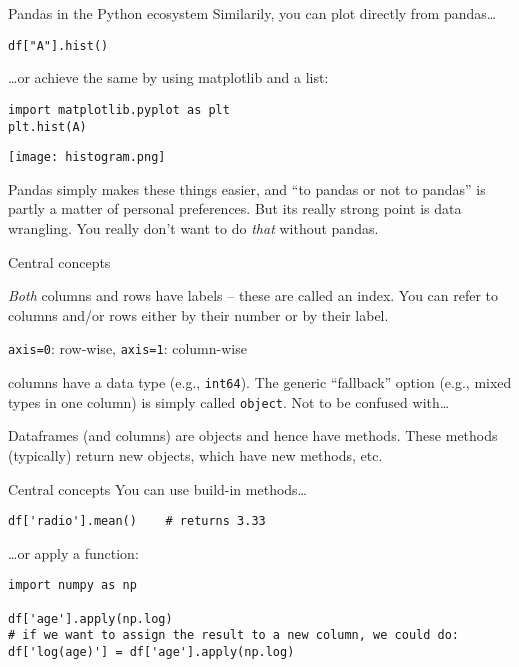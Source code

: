 \begin{frame}[fragile]{Pandas in the Python ecosystem}
 Similarily, you can plot directly from pandas\ldots
\begin{verbatim}
df["A"].hist()
\end{verbatim}
\ldots or achieve the same by using matplotlib and a list:
\begin{verbatim}
import matplotlib.pyplot as plt
plt.hist(A)
\end{verbatim}

\centering

\texttt{[image: histogram.png]}\hfill

\end{frame}


\begin{frame}[standout]
  Pandas simply makes these things easier, and ``to pandas or not to pandas'' is partly a matter of personal preferences. But its really strong point is data wrangling. You really don't want to do \emph{that} without pandas.

\end{frame}








\begin{frame}
  \begin{block}{Central concepts}
  \begin{description}[<+>]
  \item[index]\emph{Both} columns and rows have labels -- these are called an index. You can refer to columns and/or rows either by their number or by their label.
  \item[axis] \texttt{axis=0}:  row-wise, \texttt{axis=1}: column-wise
  \item[dtype]columns have a data type (e.g., \texttt{int64}). The generic ``fallback'' option (e.g., mixed types in one column) is simply called \texttt{object}. Not to be confused with\ldots
  \item[object-orientation] Dataframes (and columns) are objects and hence have methods. These methods (typically) return new objects, which have new methods, etc.
  \end{description}
\end{block}
\end{frame}


\begin{frame}[fragile]{Central concepts}
You can use build-in methods\ldots

\begin{verbatim}
df['radio'].mean()    # returns 3.33
\end{verbatim}

\ldots or apply a function:

\begin{verbatim}
import numpy as np

df['age'].apply(np.log)
# if we want to assign the result to a new column, we could do:
df['log(age)'] = df['age'].apply(np.log)
\end{verbatim}


\end{frame}


